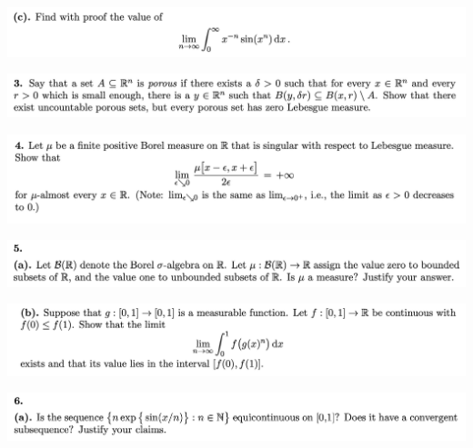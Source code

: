\begin{mdframed}
\includegraphics[width=400pt]{img/analysis--berkeley-202a-final-c137.png}
\end{mdframed}

\newpage
\begin{mdframed}
\includegraphics[width=400pt]{img/analysis--berkeley-202a-final-ef68.png}
\end{mdframed}

\newpage
\begin{mdframed}
\includegraphics[width=400pt]{img/analysis--berkeley-202a-final-21a6.png}
\end{mdframed}

\newpage
\begin{mdframed}
\includegraphics[width=400pt]{img/analysis--berkeley-202a-final-246a.png}
\end{mdframed}

\begin{mdframed}
\includegraphics[width=400pt]{img/analysis--berkeley-202a-final-cd70.png}
\end{mdframed}

\newpage
\begin{mdframed}
\includegraphics[width=400pt]{img/analysis--berkeley-202a-final-f5b6.png}
\end{mdframed}

